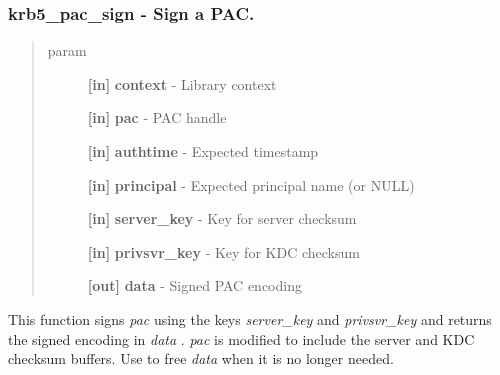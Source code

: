 \documentclass[letterpaper,10pt,english]{sphinxmanual}
\begin{document}
\subsubsection{krb5\_pac\_sign -  Sign a PAC.}
\label{appdev/refs/api/krb5_pac_sign:krb5-pac-sign-sign-a-pac}\label{appdev/refs/api/krb5_pac_sign::doc}

\begin{fulllineitems}
\label{appdev/refs/api/krb5_pac_sign:krb5_pac_sign}
\end{fulllineitems}

\begin{quote}\begin{description}
\item[{param}] \leavevmode
\textbf{{[}in{]}} \textbf{context} - Library context

\textbf{{[}in{]}} \textbf{pac} - PAC handle

\textbf{{[}in{]}} \textbf{authtime} - Expected timestamp

\textbf{{[}in{]}} \textbf{principal} - Expected principal name (or NULL)

\textbf{{[}in{]}} \textbf{server\_key} - Key for server checksum

\textbf{{[}in{]}} \textbf{privsvr\_key} - Key for KDC checksum

\textbf{{[}out{]}} \textbf{data} - Signed PAC encoding

\end{description}\end{quote}

This function signs \emph{pac} using the keys \emph{server\_key} and \emph{privsvr\_key} and returns the signed encoding in \emph{data} . \emph{pac} is modified to include the server and KDC checksum buffers. Use {\hyperref[appdev/refs/api/krb5_free_data_contents:krb5_free_data_contents]{}} to free \emph{data} when it is no longer needed.
\end{document}

